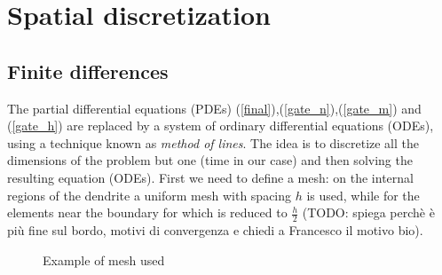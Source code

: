 \documentclass[a4paper,11pt ]{report}
\theoremstyle{definition}
\begin{document}
\chapter{Spatial discretization}
\section{Finite differences}
The partial differential equations (PDEs) (\ref{final}),(\ref{gate_n}),(\ref{gate_m}) and (\ref{gate_h}) are replaced by a system of ordinary differential equations (ODEs), using a technique known as \emph{method of lines}. The idea is to discretize all the dimensions of the problem but one (time in our case) and then solving the resulting equation (ODEs). First we need to define a mesh: on the internal regions of the dendrite a uniform mesh with spacing $h$ is used, while for the elements near the boundary for which is reduced to $\frac{h}{2}$ (TODO: spiega perchè è più fine sul bordo, motivi di convergenza e chiedi a Francesco il motivo bio).\\
\begin{figure}[h!]
\centering
{}
\caption{Example of mesh used }
\end{figure} 
\end{document}
